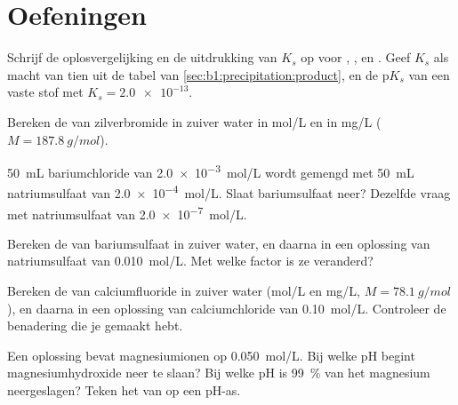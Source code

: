\section{Oefeningen}

\begin{exercise}[$\star$]\label{exo:b1:precipitation:1}
Schrijf de oplosvergelijking en de uitdrukking van $K_s$ op voor
, ,  en . Geef $K_s$ als
macht van tien uit de tabel van \cref{sec:b1:precipitation:product}, en
de $\mathrm{p}K_s$ van een vaste stof met $K_s = \num{2.0e-13}$.
\end{exercise}

\begin{exercise}[$\star$]\label{exo:b1:precipitation:2}
Bereken de  van zilverbromide in zuiver water in
\unit{mol/L} en in \unit{mg/L} ($M = \qty{187.8}{g/mol}$).
\end{exercise}

\begin{exercise}[$\star$]\label{exo:b1:precipitation:3}
\qty{50}{mL} bariumchloride van \qty{2.0e-3}{mol/L} wordt gemengd met
\qty{50}{mL} natriumsulfaat van \qty{2.0e-4}{mol/L}. Slaat bariumsulfaat
neer? Dezelfde vraag met natriumsulfaat van \qty{2.0e-7}{mol/L}.
\end{exercise}

\begin{exercise}[$\star$]\label{exo:b1:precipitation:4}
Bereken de  van bariumsulfaat in zuiver water, en daarna in
een oplossing van natriumsulfaat van \qty{0.010}{mol/L}. Met welke
factor is ze veranderd?
\end{exercise}

\begin{exercise}[$\star\star$]\label{exo:b1:precipitation:5}
Bereken de  van calciumfluoride in zuiver water
(\unit{mol/L} en \unit{mg/L}, $M = \qty{78.1}{g/mol}$), en daarna in een
oplossing van calciumchloride van \qty{0.10}{mol/L}. Controleer de
benadering die je gemaakt hebt.
\end{exercise}

\begin{exercise}[$\star\star$]\label{exo:b1:precipitation:6}
Een oplossing bevat magnesiumionen op \qty{0.050}{mol/L}. Bij welke pH
begint magnesiumhydroxide neer te slaan? Bij welke pH is
\qty{99}{\percent} van het magnesium neergeslagen? Teken het
 van  op een pH-as.
\end{exercise}


